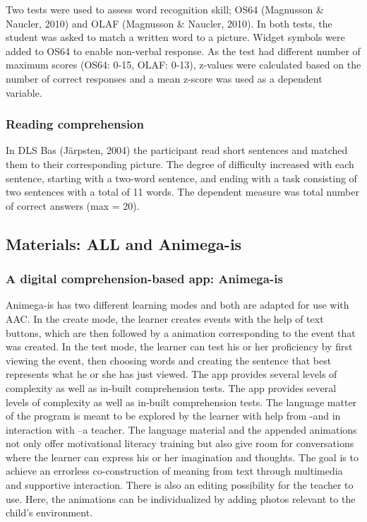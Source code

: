 \documentclass[
]{article}
\begin{document}
Two tests were used to assess word recognition skill; OS64 (Magnusson \&
Naucler, 2010) and OLAF (Magnusson \& Naucler, 2010). In both tests, the
student was asked to match a written word to a picture. Widget symbols
were added to OS64 to enable non-verbal response. As the test had
different number of maximum scores (OS64: 0-15, OLAF: 0-13), z-values
were calculated based on the number of correct responses and a mean
z-score was used as a dependent variable.

\hypertarget{reading-comprehension}{%
\subsubsection{Reading comprehension}\label{reading-comprehension}}

In DLS Bas (Järpsten, 2004) the participant read short sentences and
matched them to their corresponding picture. The degree of difficulty
increased with each sentence, starting with a two-word sentence, and
ending with a task consisting of two sentences with a total of 11 words.
The dependent measure was total number of correct answers (max = 20).

\hypertarget{materials-all-and-animega-is}{%
\subsection{Materials: ALL and
Animega-is}\label{materials-all-and-animega-is}}

\hypertarget{a-digital-comprehension-based-app-animega-is}{%
\subsubsection{A digital comprehension-based app:
Animega-is}\label{a-digital-comprehension-based-app-animega-is}}

Animega-is has two different learning modes and both are adapted for use
with AAC. In the create mode, the learner creates events with the help
of text buttons, which are then followed by a animation corresponding to
the event that was created. In the test mode, the learner can test his
or her proficiency by first viewing the event, then choosing words and
creating the sentence that best represents what he or she has just
viewed. The app provides several levels of complexity as well as
in-built comprehension tests. The app provides several levels of
complexity as well as in-built comprehension tests. The language matter
of the program is meant to be explored by the learner with help from
-and in interaction with --a teacher. The language material and the
appended animations not only offer motivational literacy training but
also give room for conversations where the learner can express his or
her imagination and thoughts. The goal is to achieve an errorless
co-construction of meaning from text through multimedia and supportive
interaction. There is also an editing possibility for the teacher to
use. Here, the animations can be individualized by adding photos
relevant to the child's environment.
\end{document}
